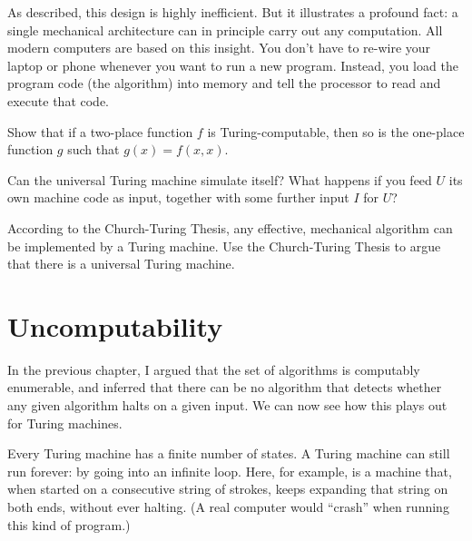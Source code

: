 As described,
this design is highly inefficient.
But it illustrates a profound fact:
a single mechanical architecture can in principle carry out any computation.
All modern computers are based on this insight.
You don't have to re-wire your laptop or phone whenever you want to run a new program.
Instead,
you load the program code (the algorithm) into memory
and tell the processor to read and execute that code.

\begin{exercise}
  Show that if a two-place function $f$ is Turing-computable,
  then so is the one-place function $g$ such that $g(x) = f(x,x)$.
\end{exercise}

\begin{exercise}
  Can the universal Turing machine simulate itself?
  What happens if you feed $U$ its own machine code as input,
  together with some further input $I$ for $U$?
\end{exercise}

\begin{exercise}
  According to the Church-Turing Thesis,
  any effective, mechanical algorithm can be implemented by a Turing machine.
  Use the Church-Turing Thesis to argue that
  there is a universal Turing machine.
\end{exercise}

\section{Uncomputability}\label{sec:tm-uncomputability}

In the previous chapter,
I argued that
the set of algorithms is computably enumerable,
and inferred that
there can be no algorithm that
detects whether any given algorithm halts on a given input.
We can now see how this plays out for Turing machines.



Every Turing machine has a finite number of states.
A Turing machine can still run forever:
by going into an infinite loop.
Here,
for example,
is a machine that,
when started on a consecutive string of strokes,
keeps expanding that string on both ends,
without ever halting.
(A real computer would ``crash'' when running this kind of program.)

